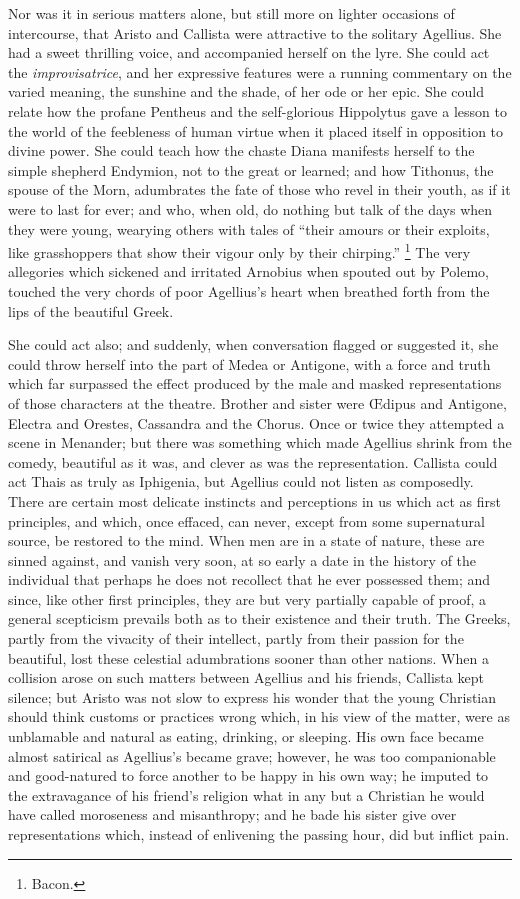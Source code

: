 Nor was it in serious matters alone, but still more on lighter
occasions of intercourse, that Aristo and Callista were
attractive to the solitary Agellius. She had a sweet thrilling voice,
and accompanied herself on the lyre. She could act the \emph{improvisatrice},
and her expressive features were a running commentary on the varied
meaning, the sunshine and the shade, of her ode or her epic. She could
relate how the profane Pentheus and the self-glorious Hippolytus gave
a lesson to the world of the feebleness of human virtue when it placed
itself in opposition to divine power. She could teach how the chaste
Diana manifests herself to the simple shepherd Endymion, not to the
great or learned; and how Tithonus, the spouse of the Morn, adumbrates
the fate of those who revel in their youth, as if it were to last for
ever; and who, when old, do nothing but talk of the days when they
were young, wearying others with tales of ``their amours or their
exploits, like grasshoppers that show their vigour only by their
chirping.'' \footnote{Bacon.} The very allegories which sickened and
irritated Arnobius when spouted out by Polemo, touched the very chords
of poor Agellius's heart when breathed forth from the lips of the
beautiful Greek.

She could act also; and suddenly, when conversation flagged or
suggested it, she could throw herself into the part of Medea or
Antigone, with a force and truth which far surpassed the effect
produced by the male and masked representations of those characters at
the theatre. Brother and sister were Œdipus and Antigone, Electra and
Orestes, Cassandra and the Chorus. Once or twice they attempted a
scene in Menander; but there was something which made Agellius shrink
from the comedy, beautiful as it was, and clever as was the
representation. Callista could act Thais as truly as Iphigenia, but
Agellius could not listen as composedly. There are certain most
delicate instincts and perceptions in us which act as first
principles, and which, once effaced, can never, except from some
supernatural source, be restored to the mind. When men are in a state
of nature, these are sinned against, and vanish very soon, at so early
a date in the history of the individual that perhaps he does not
recollect that he ever possessed them; and since, like other first
principles, they are but very partially capable of proof, a general
scepticism prevails both as to their existence and their truth. The
Greeks, partly from the vivacity of their intellect, partly from their
passion for the beautiful, lost these celestial adumbrations sooner
than other nations. When a collision arose on such matters between
Agellius and his friends, Callista kept silence; but Aristo was not
slow to express his wonder that the young Christian should think
customs or practices wrong which, in his view of the matter, were as
unblamable and natural as eating, drinking, or sleeping. His own face
became almost satirical as Agellius's became grave; however, he was
too companionable and good-natured to force another to be happy in his
own way; he imputed to the extravagance of his friend's religion what
in any but a Christian he would have called moroseness and
misanthropy; and he bade his sister give over representations which,
instead of enlivening the passing hour, did but inflict pain.

